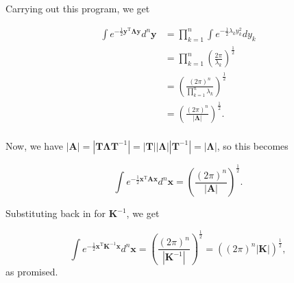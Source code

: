 \documentclass{article}
\newcommand{\mv}[1]{\mathbf{#1}}	%
\newcommand{\mvt}[1]{\mv{#1}^{\mathrm{T}}}
\newcommand{\mvi}[1]{\mv{#1}^{-1}}
\begin{document}
Carrying out this program, we get

\begin{align}
\int e^{-\frac{1}{2} \mvt{y} \mv{\Lambda}\mv{y}} d^n \mv{y}
&= \prod_{k=1}^{n} \int e^{-\frac{1}{2} \lambda_k y_k^2} d y_k\\
&= \prod_{k=1}^{n} \left(\frac{2 \pi}{\lambda_k}\right)^{\frac{1}{2}} \\
&= \left(\frac{(2 \pi)^n}{\prod_{k=1}^{n}\lambda_k}\right)^{\frac{1}{2}} \\
&= \left(\frac{(2 \pi)^n}{|\mv{\Lambda}|}\right)^{\frac{1}{2}}. \\
\end{align}

Now, we have $|\mv{A}| = |\mv{T} \mv{\Lambda} \mvi{T}| = |\mv{T}| |\mv{\Lambda}| |\mvi{T}|  = |\mv{\Lambda}|$, so this becomes

\begin{equation}
\int e^{-\frac{1}{2} \mvt{x} \mv{A} \mv{x}} d^n \mv{x} = \left(\frac{(2 \pi)^n}{|\mv{A}|}\right)^{\frac{1}{2}}.
\end{equation}

Substituting back in for $\mvi{K}$, we get

\begin{equation}
\int e^{-\frac{1}{2} \mvt{x} \mvi{K} \mv{x}} d^n \mv{x} = \left(\frac{(2 \pi)^n}{|\mvi{K}|}\right)^{\frac{1}{2}} = \left((2 \pi)^n |\mv{K}|\right)^{\frac{1}{2}},
\end{equation}
as promised.
\end{document}
